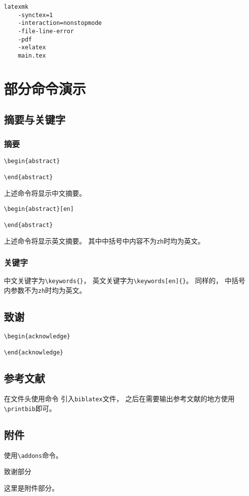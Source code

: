 \documentclass{hainanuthesis}
\begin{document}
\begin{verbatim}
latexmk
    -synctex=1
    -interaction=nonstopmode
    -file-line-error
    -pdf
    -xelatex
    main.tex
\end{verbatim}

\section{部分命令演示}

\subsection{摘要与关键字}

\subsubsection{摘要}
\begin{verbatim}
\begin{abstract}

\end{abstract}
\end{verbatim}

上述命令将显示中文摘要。

\begin{verbatim}
\begin{abstract}[en]

\end{abstract}
\end{verbatim}

上述命令将显示英文摘要。
其中中括号中内容不为\verb|zh|时均为英文。

\subsubsection{关键字}

中文关键字为\verb|\keywords{}|，
英文关键字为\verb|\keywords[en]{}|。
同样的，
中括号内参数不为\verb|zh|时均为英文。

\subsection{致谢}

\begin{verbatim}
\begin{acknowledge}

\end{acknowledge}
\end{verbatim}

\subsection{参考文献}

在文件头使用命令
\verb||
引入\verb|biblatex|文件，
之后在需要输出参考文献的地方使用
\verb|\printbib|即可。

\subsection{附件}

使用\verb|\addons|命令。

\begin{acknowledge}
    致谢部分
\end{acknowledge}

\addons

这里是附件部分。
\end{document}
